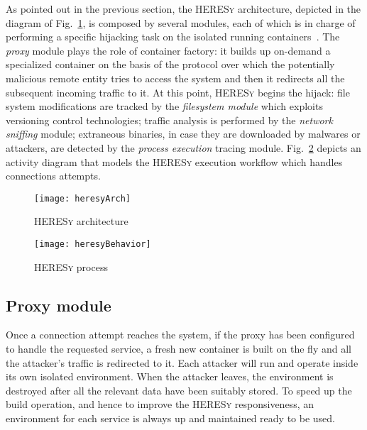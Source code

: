 As pointed out in the previous section, the \textsc{HERESy} architecture, depicted in   the diagram of Fig.~\ref{fig:harch}, is composed by several modules,
each of which  is in charge of  performing a specific hijacking task on the isolated running containers~\cite{docker}.
The \textit{proxy} module plays the role of  container factory: it builds up on-demand a specialized container on the basis of the protocol over which the potentially malicious remote entity tries to access the system and then it redirects all the subsequent incoming traffic to it. At this point, \textsc{HERESy} begins the hijack: file system modifications are tracked by the \textit{filesystem  module} which exploits versioning control technologies; traffic analysis is performed
by the \textit{network sniffing} module; extraneous binaries,  in case they are downloaded by malwares or attackers, are detected by the \textit{process execution} tracing module. Fig.~\ref{fig:wf} depicts an activity diagram that models the \textsc{HERESy} execution workflow which handles connections attempts.

\begin{figure}[tbp]

\texttt{[image: heresyArch]}
\caption{\textsc{HERESy} architecture}
\label{fig:harch}
\end{figure}

\begin{figure}[tb]

	\centering
	\texttt{[image: heresyBehavior]}
	\caption{\textsc{HERESy} process}
		\label{fig:wf}
\end{figure}

\subsection{Proxy module}
\label{sub:proxy}
Once a connection attempt reaches the system, if the proxy has been configured to handle the requested service, a fresh new container is built on the fly and all the attacker's traffic is redirected to it.
Each attacker will run and operate inside its own isolated environment. When the attacker leaves, the environment is destroyed after all the relevant data have been suitably stored. To speed up the build operation, and hence to improve the \textsc{HERESy} responsiveness, an environment for each service is always up and maintained ready to be used.



